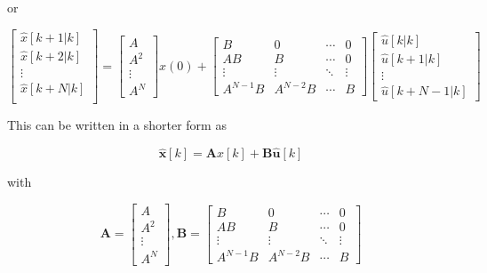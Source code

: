 \noindent
or

\noindent
\begin{equation}
	\left[
		\begin{matrix}
			\hat{x}[k+1|k] \\
			\hat{x}[k+2|k] \\
			\vdots \\
			\hat{x}[k+N|k] \\
		\end{matrix}
	\right] = 
	\left[
		\begin{matrix}
			A \\
			A^2 \\
			\vdots \\
			A^N
		\end{matrix}
	\right]
	x(0) + 
	\left[
		\begin{matrix}
			B & 0 & \cdots & 0 \\
			AB & B & \cdots & 0 \\
			\vdots & \vdots & \ddots & \vdots \\
			A^{N-1}B & A^{N-2}B & \cdots & B
		\end{matrix}
	\right]
	\left[
		\begin{matrix}
			\hat{u}[k|k] \\
			\hat{u}[k+1|k]\\
			\vdots \\
			\hat{u}[k+N-1|k]
		\end{matrix}
	\right]
\end{equation}

This can be written in a shorter form as



\noindent
\begin{equation}
	\label{eq:cap3:stacked-state-prediction}
	\mathbf{\hat{x}}[k] = \mathbf{A}x[k] + \mathbf{B \hat{u}}[k]
\end{equation}

\noindent
with 

\noindent
\begin{equation}
	\mathbf{A} = \left[
		\begin{matrix}
			A \\
			A^2 \\
			\vdots \\
			A^N
		\end{matrix}
	\right]
	, 
	\mathbf{B} = \left[
		\begin{matrix}
			B  & 0 & \cdots & 0 \\
			AB & B & \cdots & 0 \\
			\vdots  & \vdots & \ddots & \vdots \\
			A^{N-1}B & A^{N-2}B & \cdots & B
		\end{matrix}
	\right]
\end{equation}

